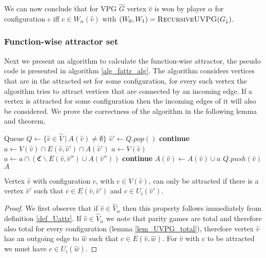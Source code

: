 We can now conclude that for VPG $\hat{G}$ vertex $\hat{v}$ is won by player $\alpha$ for configuration $c$ iff $c \in W_\alpha(\hat{v})$ with $(W_0,W_1) = \textsc{RecursiveUVPG}(G_{\downarrow})$.

\subsubsection{Function-wise attractor set}
Next we present an algorithm to calculate the function-wise attractor, the pseudo code is presented in algorithm \ref{alg_fattr_alg}. The algorithm considers vertices that are in the attracted set for some configuration, for every such vertex the algorithm tries to attract vertices that are connected by an incoming edge. If a vertex is attracted for some configuration then the incoming edges of it will also be considered. We prove the correctness of the algorithm in the following lemma and theorem.
\begin{algorithm}
	\caption{$\textsc{$\alpha$-FAttractor}(G, A : \hat{V} \rightarrow 2^\mathfrak{C})$}\label{alg_fattr_alg}
	\begin{algorithmic}[1]
		\State Queue $Q \gets \{\hat{v} \in \hat{V} \ |\ A(\hat{v}) \neq \emptyset  \}$
		\State $\hat{v}' \gets Q.pop()$
			 \State \textbf{continue} \EndIf
				\State $a \gets V(\hat{v}) \cap E(\hat{v},\hat{v}') \cap A(\hat{v}')$
			\Else
				\State $a \gets V(\hat{v})$
					\State $a \gets a \cap (\mathfrak{C}\backslash E(\hat{v},\hat{v}'') \cup A(\hat{v}''))$
				\EndFor
			\EndIf
			 \State \textbf{continue} \EndIf
			\State $A(\hat{v}) \gets A(\hat{v}) \cup a$
			\State $Q.push(\hat{v})$
		\EndFor
		\EndWhile
		\State \Return $A$
	\end{algorithmic}
\end{algorithm}
\begin{lemma}
\label{lem_attr_requires_E}
Vertex $\hat{v}$ with configuration $c$, with $c \in V(\hat{v})$, can only be attracted if there is a vertex $\hat{v}'$ such that $c \in E(\hat{v}, \hat{v}')$ and $c \in U_i(\hat{v}')$.
	\begin{proof}
		We first observe that if $\hat{v} \in \hat{V}_\alpha$ then this property follows immediately from definition \ref{def_Uattr}. If $\hat{v} \in \hat{V}_{\overline{\alpha}}$ we note that parity games are total and therefore also total for every configuration (lemma \ref{lem_UVPG_total}), therefore vertex $\hat{v}$ has an outgoing edge to $\hat{w}$ such that $c \in E(\hat{v},\hat{w})$. For $\hat{v}$ with $c$ to be attracted we must have $c \in U_i(\hat{w})$.
	\end{proof}
\end{lemma}
